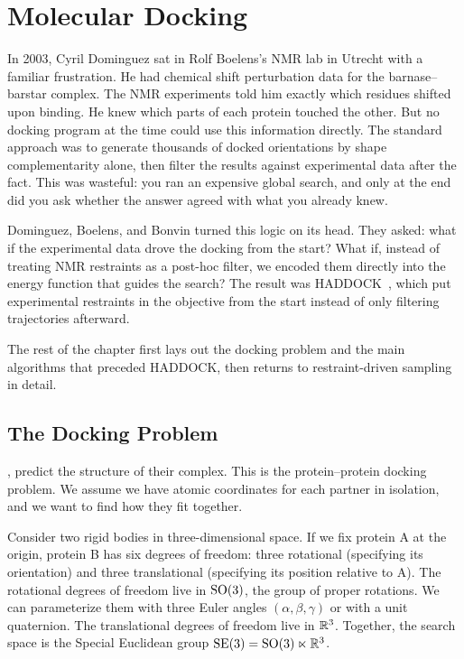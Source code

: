\chapter{Molecular Docking}
\label{ch:docking}

In 2003, Cyril Dominguez sat in Rolf Boelens's NMR lab in Utrecht with a familiar frustration.
He had chemical shift perturbation data for the barnase--barstar complex.
The NMR experiments told him exactly which residues shifted upon binding.
He knew which parts of each protein touched the other.
But no docking program at the time could use this information directly.
The standard approach was to generate thousands of docked orientations by shape complementarity alone, then filter the results against experimental data after the fact.
This was wasteful: you ran an expensive global search, and only at the end did you ask whether the answer agreed with what you already knew.

Dominguez, Boelens, and Bonvin turned this logic on its head.
They asked: what if the experimental data drove the docking from the start?
What if, instead of treating NMR restraints as a post-hoc filter, we encoded them directly into the energy function that guides the search?
The result was HADDOCK~\cite{dominguez2003}, which put experimental restraints in the objective from the start instead of only filtering trajectories afterward.

The rest of the chapter first lays out the docking problem and the main algorithms that preceded HADDOCK, then returns to restraint-driven sampling in detail.

\section{The Docking Problem}
\label{sec:docking-problem}

, predict the structure of their complex.
This is the protein--protein docking problem.
We assume we have atomic coordinates for each partner in isolation, and we want to find how they fit together.

Consider two rigid bodies in three-dimensional space.
If we fix protein A at the origin, protein B has six degrees of freedom: three rotational (specifying its orientation) and three translational (specifying its position relative to A).
The rotational degrees of freedom live in $\mathrm{SO}(3)$, the group of proper rotations.
We can parameterize them with three Euler angles $(\alpha, \beta, \gamma)$ or with a unit quaternion.
The translational degrees of freedom live in $\mathbb{R}^3$.
Together, the search space is the Special Euclidean group $\mathrm{SE}(3) = \mathrm{SO}(3) \ltimes \mathbb{R}^3$.

